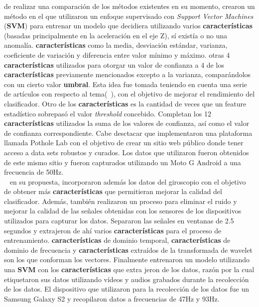 		 de realizar una comparación de los métodos existentes en su momento, crearon un método en el que utilizaron
		un enfoque supervisado con \emph{Support Vector Machines} (\textbf{SVM}) para entrenar un modelo que decidiera utilizando varios \textbf
		{características} (basadas principalmente en la aceleración en el eje Z), sí existía o no una anomalía. \textbf{características} como la media,
		desviación estándar, varianza, coeficiente de variación y diferencia entre valor mínimo y máximo. otras 4 \textbf{características} utilizados
		para otorgar un valor de confianza a 4 de los \textbf{características} previamente mencionados excepto a la varianza, comparándolos con un cierto
		valor \textbf{umbral}. Esta idea fue tomada teniendo en cuenta una serie de artículos con respecto al tema(~), con el
		objetivo de mejorar el rendimiento del clasificador. Otro de los \textbf{características} es la cantidad de veces que un feature estadístico
		sobrepasó el valor \emph {threshold} concebido. Completan los 12 \textbf{características} utilizados la suma de los valores de confianza, así
		como el valor de confianza correspondiente. Cabe desctacar que implementaron una plataforma llamada Pothole Lab con el objetivo de crear un
		sitio web público donde tener acceso a data sets robustos y curados. Los datos que utilizaron fueron obtenidos de este mismo sitio y fueron
		capturados utilizando un Moto G Android a una frecuencia de 50Hz.\\

		~ en su propuesta, incorporaron además los datos del giroscopio con el objetivo de obtener más \textbf{características}
		que permitieran mejorar la calidad del clasificador. Además, también realizaron un proceso para eliminar el ruido y mejorar la calidad de
		las señales obtenidas con los sensores de los dispositivos utilizados para capturar los datos. Separaron las señales en ventanas de 2.5
		segundos y extrajeron de ahí varios \textbf{características} para el proceso de entrenamiento. \textbf{características} de dominio temporal,
		\textbf{características} de dominio de frecuencia y \textbf{características} extraídos de la transformada de wavelet son los que conforman los
		vectores. Finalmente entrenaron un modelo utilizando una \textbf{SVM} con los \textbf{características} que extra jeron de los datos, razón por
		la cual etiquetaron sus datos utilizando vídeos y audios grabados durante la recolección de los datos. El dispositivo que utilizaron para la
		recolección de los datos fue un Samsung Galaxy S2 y recopilaron datos a frecuencias de 47Hz y 93Hz.\\

